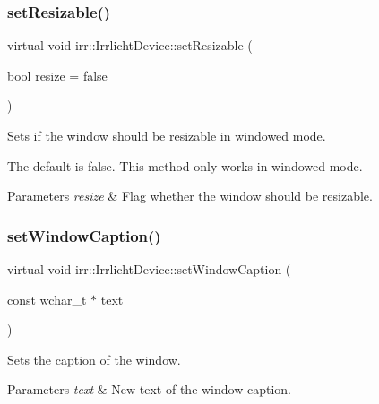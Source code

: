 \subsubsection{\texorpdfstring{set\+Resizable()}{setResizable()}\hspace{0.1cm}{\footnotesize\ttfamily [2/2]}}
{\footnotesize\ttfamily virtual void irr\+::\+Irrlicht\+Device\+::set\+Resizable (\begin{DoxyParamCaption}\item[{bool}]{resize = {\ttfamily false} }\end{DoxyParamCaption})\hspace{0.3cm}{\ttfamily [pure virtual]}}



Sets if the window should be resizable in windowed mode. 

The default is false. This method only works in windowed mode. 
\begin{DoxyParams}{Parameters}
{\em resize} & Flag whether the window should be resizable. \\
\hline
\end{DoxyParams}
\mbox{\label{classirr_1_1IrrlichtDevice_a3d7c98d520bf18ce1973c6f1439a7c0f}} 
\subsubsection{\texorpdfstring{set\+Window\+Caption()}{setWindowCaption()}\hspace{0.1cm}{\footnotesize\ttfamily [1/2]}}
{\footnotesize\ttfamily virtual void irr\+::\+Irrlicht\+Device\+::set\+Window\+Caption (\begin{DoxyParamCaption}\item[{const wchar\+\_\+t $\ast$}]{text }\end{DoxyParamCaption})\hspace{0.3cm}{\ttfamily [pure virtual]}}



Sets the caption of the window. 


\begin{DoxyParams}{Parameters}
{\em text} & New text of the window caption. \\
\hline
\end{DoxyParams}
\mbox{\label{classirr_1_1IrrlichtDevice_a3d7c98d520bf18ce1973c6f1439a7c0f}} 
